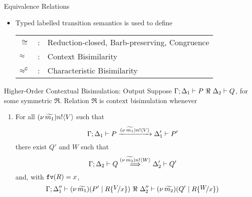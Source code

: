 \documentclass{beamer}
\begin{document}
	\begin{frame}{Equivalence Relations}
		\begin{itemize}
			\item	Typed labelled transition semantics is used to define

			\begin{tabular}{lcl}
				$\cong$ &:& Reduction-closed, Barb-preserving, Congruence\\
				$\approx$ &:& Context Bisimilarity\\
				$\approx^\mathtt{C}$ &:& Characteristic Bisimilarity
			\end{tabular}

		\end{itemize}
	\end{frame}


	\begin{frame}{Higher-Order Contextual Bisimulation: Output}
		Suppose $\Gamma; \Delta_1 \vdash P\ \Re\ \Delta_2 \vdash Q$, for some symmetric $\Re$. Relation $\Re$ is
		context bisimulation whenever
		\begin{enumerate}[$(\star)$]
			\item	For all $(\nu\, \widetilde{m_1}) n ! \langle V \rangle$ such that
				\[
					\Gamma; \Delta_1 \vdash P \xrightarrow{(\nu\, \widetilde{m_1}) n ! \langle V \rangle} \Delta_1' \vdash P'
				\]
				there exist $Q'$ and $W$ such that 
				\[
					\Gamma; \Delta_2 \vdash Q \stackrel{(\nu\, \widetilde{m_2}) n ! \langle W \rangle}{\Longrightarrow} \Delta_2' \vdash Q'
				\]
				and,   with $\mathtt{fv}(R)=x$, 
				\[
					\Gamma; \Delta_1'' \proves \newsp{\widetilde{m_1}}{P' \Par R\subst{V}{x}}\ \Re\ \Delta_2'' \proves \newsp{\widetilde{m_2}}{Q' \Par R\subst{W}{x}}
				\]
		\end{enumerate}
	\end{frame}
\end{document}
